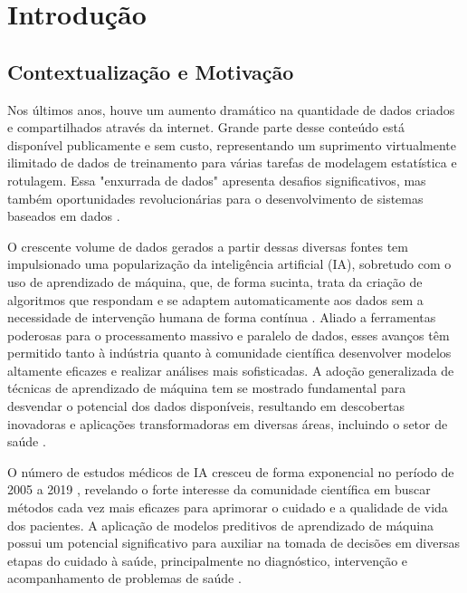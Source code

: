 
\chapter[Introdução]{Introdução}
\label{Introdução}

\section{Contextualização e Motivação}\label{sec-context}

Nos últimos anos, houve um aumento dramático na quantidade de dados criados e compartilhados através da internet. Grande parte desse conteúdo está disponível publicamente e sem custo, representando um suprimento virtualmente ilimitado de dados de treinamento para várias tarefas de modelagem estatística e rotulagem. Essa "enxurrada de dados" apresenta desafios significativos, mas também oportunidades revolucionárias para o desenvolvimento de sistemas baseados em dados \cite{SeltzerZ09}.

O crescente volume de dados gerados a partir dessas diversas fontes tem impulsionado uma popularização da inteligência artificial (IA), sobretudo com o uso de aprendizado de máquina, que, de forma sucinta, trata da criação de algoritmos que respondam e se adaptem automaticamente aos dados sem a necessidade de intervenção humana de forma contínua \cite{chiavegatto2015}. Aliado a ferramentas poderosas para o processamento massivo e paralelo de dados, esses avanços têm permitido tanto à indústria quanto à comunidade científica desenvolver modelos altamente eficazes e realizar análises mais sofisticadas. A adoção generalizada de técnicas de aprendizado de máquina tem se mostrado fundamental para desvendar o potencial dos dados disponíveis, resultando em descobertas inovadoras e aplicações transformadoras em diversas áreas, incluindo o setor de saúde \cite{mlaplicadosaude}.

O número de estudos médicos de IA cresceu de forma exponencial no período de 2005 a 2019 \cite{ShortGuide2020}, revelando o forte interesse da comunidade científica em buscar métodos cada vez mais eficazes para aprimorar o cuidado e a qualidade de vida dos pacientes. A aplicação de modelos preditivos de aprendizado de máquina possui um potencial significativo para auxiliar na tomada de decisões em diversas etapas do cuidado à saúde, principalmente no diagnóstico, intervenção e acompanhamento de problemas de saúde \cite{obermeyer2017}.

